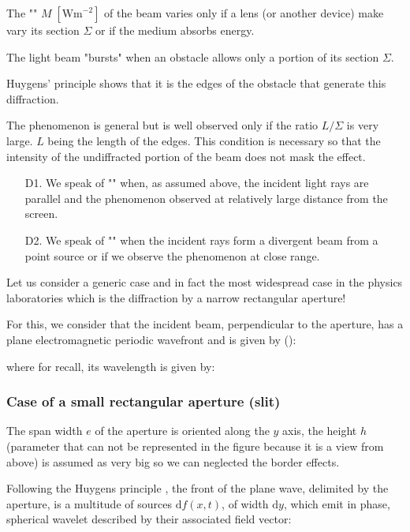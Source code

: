 	The "" $M \; [\text{Wm}^{-2}]$ of the beam varies only if a lens (or another device) make vary its section $\Sigma$ or if the medium absorbs energy.
	
	The light beam "bursts" when an obstacle allows only a portion of its section $\Sigma$.
	
	Huygens' principle shows that it is the edges of the obstacle that generate this diffraction.
	
	The phenomenon is general but is well observed only if the ratio $L/\Sigma$ is very large. $L$ being the length of the edges. This condition is necessary so that the intensity of the undiffracted portion of the beam does not mask the effect.
	
	\begin{enumerate}
		\item[D1.] We speak of "" when, as assumed above, the incident light rays are parallel and the phenomenon observed at relatively large distance from the screen.

		\item[D2.] We speak of "" when the incident rays form a divergent beam from a point source or if we observe the phenomenon at close range.
	\end{enumerate}
	
	Let us consider a generic case and in fact the most widespread case in the physics laboratories which is the diffraction by a narrow rectangular aperture!
	
	For this, we consider that the incident beam, perpendicular to the aperture, has a plane electromagnetic periodic wavefront and is given by ():
	
	where for recall, its wavelength is given by:
	
	
	\subsubsection{Case of a small rectangular aperture (slit)}
	The span width $e$ of the aperture is oriented along the $y$ axis, the height $h$ (parameter that can not be represented in the figure because it is a view from above) is assumed as very big so we can neglected the border effects.

	Following the Huygens principle , the front of the plane wave, delimited by the aperture, is a multitude of sources $\mathrm{d}f(x,t)$, of width $\mathrm{d}y$, which emit in phase, spherical wavelet described by their associated field vector:
	

